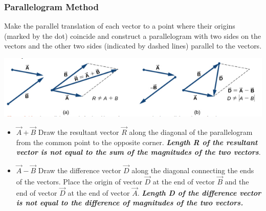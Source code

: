 \documentclass[12pt,addpoints]{exam}
\begin{document}
	\subsubsection*{Parallelogram Method}
	Make the parallel translation of each vector to a point where their origins (marked by the dot) coincide and construct a parallelogram with two sides on the vectors and the other two sides (indicated by dashed lines) parallel to the vectors. 
	\begin{center}
		\includegraphics[scale=0.5]{parallelogram.png}
	\end{center}
	\begin{itemize}
		\item $\vec{A}+\vec{B}$ Draw the resultant vector $\vec{R}$ along the diagonal of the parallelogram from the common point to the opposite corner. \textit{\textbf{Length R of the resultant vector is not equal to the sum of the magnitudes of the two vectors}}.
		\item $\vec{A}-\vec{B}$ Draw the difference vector $\vec{D}$ along the diagonal connecting the ends of the vectors. Place the origin of vector $\vec{D}$ at the end of vector $\vec{B}$ and the end of vector $\vec{D}$ at the end of vector $\vec{A}$. \textit{\textbf{Length D of the difference vector is not equal to the difference of magnitudes of the two vectors.}} 
	\end{itemize} 
\end{document}
